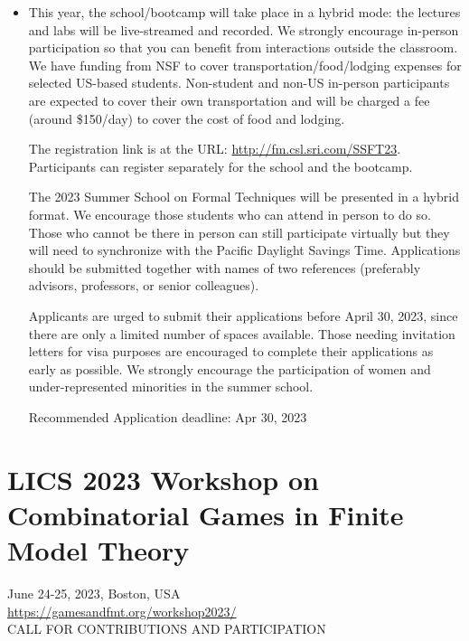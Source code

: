 \documentclass[prodmode,acmtecs]{acmsmall} %
\begin{document}
\begin{itemize}
\item  This year, the school/bootcamp will take place in a hybrid mode: the lectures and labs will be live-streamed and recorded. We strongly encourage in-person participation so that you can benefit from interactions outside the classroom. We have funding from NSF to cover transportation/food/lodging expenses for selected US-based students. Non-student and non-US in-person participants are expected to cover their own transportation and will be charged a fee (around \$150/day) to cover the cost of food and lodging. 
 
  The registration link is at the URL: \href{http://fm.csl.sri.com/SSFT23}{http://fm.csl.sri.com/SSFT23}. Participants can register separately for the school and the bootcamp. 
 
  The 2023 Summer School on Formal Techniques will be presented in a hybrid format.  We encourage those students who can attend in person to do so.  Those who cannot be there in person can still participate virtually but they will need to synchronize with the Pacific Daylight Savings Time. Applications should be submitted together with names of two references (preferably advisors, professors, or senior colleagues). 
 
  Applicants are urged to submit their applications before April 30, 2023, since there are only a limited number of spaces available.  Those needing invitation letters for visa purposes are encouraged to complete their applications as early as possible.  We strongly encourage the participation of women and under-represented minorities in the summer school.  
 
Recommended Application deadline: Apr 30, 2023 
 
\end{itemize}\section{LICS 2023 Workshop on Combinatorial Games in Finite Model Theory}\label{LICS2023WorkshoponCombinatorialGamesinFiniteModelTheory}  June 24-25, 2023, Boston, USA\\ 
  \href{https://gamesandfmt.org/workshop2023/}{https://gamesandfmt.org/workshop2023/}\\ 
CALL FOR CONTRIBUTIONS AND PARTICIPATION 
\end{document}
